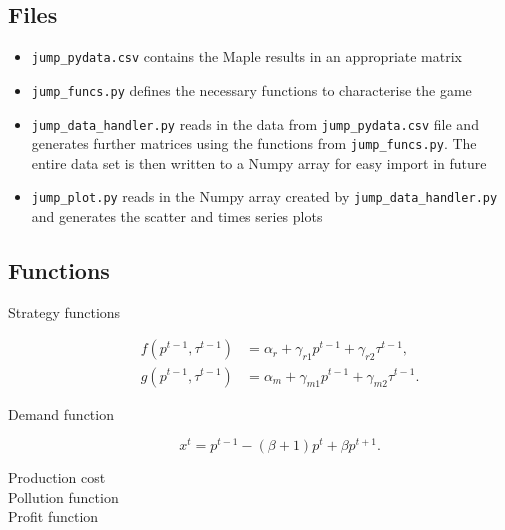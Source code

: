 \documentclass{amsart}
\begin{document}
\subsection{Files}
\label{sec:files}

\begin{itemize}
\item \texttt{jump\_pydata.csv} contains the Maple results in an
  appropriate matrix
\item \texttt{jump\_funcs.py} defines the necessary functions to
  characterise the game
\item \texttt{jump\_data\_handler.py} reads in the data from
  \texttt{jump\_pydata.csv} file and generates further matrices using
  the functions from \texttt{jump\_funcs.py}. The entire data set is
  then written to a Numpy array for easy import in future
\item \texttt{jump\_plot.py} reads in the Numpy array created by
  \texttt{jump\_data\_handler.py} and generates the scatter and times
  series plots
\end{itemize}

\subsection{Functions}
\label{sec:functions}

\begin{description}
\item[Strategy functions]
  \begin{align}
    \label{eq:1}
    f(p^{t-1},\tau^{t-1}) &= \alpha_r + \gamma_{r1} p^{t-1} +
    \gamma_{r2} \tau^{t-1}, \\
    g(p^{t-1},\tau^{t-1}) &= \alpha_m + \gamma_{m1} p^{t-1} +
    \gamma_{m2} \tau^{t-1}.
  \end{align}
\item[Demand function]
  \begin{equation}
    \label{eq:2}
      x^t = p^{t-1} - (\beta+1)p^t + \beta p^{t+1}.
  \end{equation}
\item[Production cost]

\item[Pollution function]

\item[Profit function]


\end{description}
\end{document}
